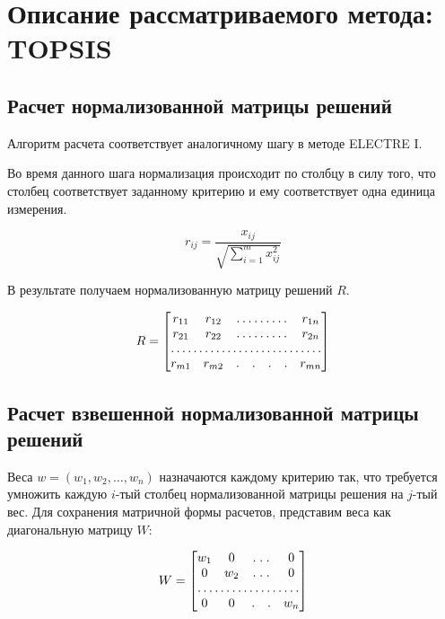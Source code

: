 \documentclass{article}
\begin{document}
\section{Описание рассматриваемого метода: TOPSIS}
    \subsection{Расчет нормализованной матрицы решений}
        Алгоритм расчета соответствует аналогичному шагу в методе ELECTRE I.

        Во время данного шага нормализация происходит по столбцу в силу того, что столбец
        соответствует заданному критерию и ему соответствует одна единица измерения.

        \begin{equation}
            \label{eq:norm_decision_matrix}
            r_{ij} = \frac{x_{ij}}{\sqrt{\sum_{i=1}^{m}x_{ij}^2}}
        \end{equation}

        В результате получаем нормализованную матрицу решений \(R\).

        \[
            R = \begin{bmatrix}
             r_{11}&  r_{12}& \hdotsfor{4} & r_{1n}\\
             r_{21}&  r_{22}& \hdotsfor{4} & r_{2n}\\
            \hdotsfor{7}\\
            r_{m1}&  r_{m2}& . & . & . & . & r_{mn}\\
            \end{bmatrix}
        \]

    \subsection{Расчет взвешенной нормализованной матрицы решений}
        Веса \(w=(w_1,w_2,\dots,w_n)\) назначаются каждому критерию так, что требуется умножить
        каждую \(i\)-тый столбец нормализованной матрицы решения на \(j\)-тый вес.
        Для сохранения матричной формы расчетов, представим веса как диагональную матрицу \(W\):

        \[
            W = \begin{bmatrix}
                w_{1}&  0 & \hdotsfor{2} & 0\\
                0 &  w_{2}& \hdotsfor{2} & 0\\
                \hdotsfor{5}\\
                0 &  0 & . & . & w_{n}\\
            \end{bmatrix}
        \]
\end{document}
